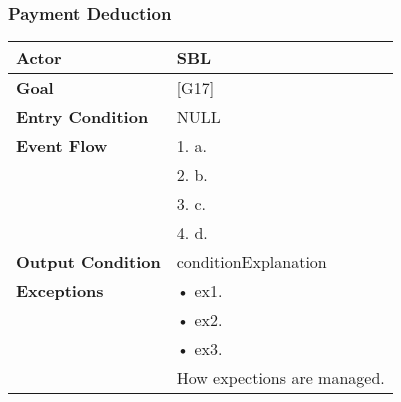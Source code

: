 \subsubsection{Payment Deduction}
\begin{tabular}{| l | p{8cm} |}
\hline
\textbf{Actor}      &       SBL \\
\hline
\textbf{Goal}       &       [G17]\\
\hline
\textbf{Entry Condition} &  NULL\\
\hline
\textbf{Event Flow}     &   1.	a.\\&
                                            2.	b.\\&
                                            3.	c.\\&
                                            4.  d.\\
\hline
\textbf{Output Condition} & conditionExplanation\\
\hline
\textbf{Exceptions} &       •   ex1.\\& 
                            •	ex2.\\&
                            •	ex3.\\& 
                           How expections are managed.\\
\hline
\end{tabular} 